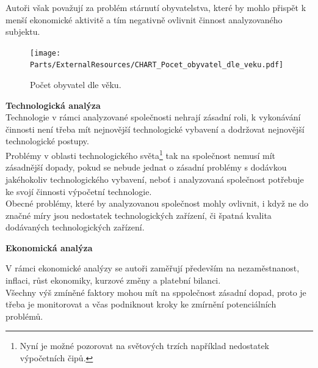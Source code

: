 Autoři však považují za problém stárnutí obyvatelstva, které by mohlo přispět k menší ekonomické aktivitě a tím negativně ovlivnit činnost analyzovaného subjektu.\\

\newpage

\begin{figure}[!hbtp]
	\centering
	\texttt{[image: Parts/ExternalResources/CHART\_Pocet\_obyvatel\_dle\_veku.pdf]}
	\caption[Počet obyvatel dle věku]{Počet obyvatel dle věku.}
	\label{fig:Pocet obyvatel dle veku}
\end{figure}




\noindent\textbf{Technologická analýza}\\

Technologie v rámci analyzované společnosti nehrají zásadní roli, k vykonávání činnosti není třeba mít nejnovější technologické vybavení a dodržovat nejnovější technologické postupy.\\

Problémy v oblasti technologického světa\footnote{Nyní je možné pozorovat na světových trzích například nedostatek výpočetních čipů.} tak na společnost nemusí mít zásadnější dopady, pokud se nebude jednat o zásadní problémy s dodávkou jakéhokoliv technologického vybavení, neboť i analyzovaná společnost potřebuje ke svojí činnosti výpočetní technologie.\\

Obecné problémy, které by analyzovanou společnost mohly ovlivnit, i když ne do značné míry jsou nedostatek technologických zařízení, či špatná kvalita dodávaných technologických zařízení.\\

\newpage

\noindent\textbf{Ekonomická analýza}\\

\vspace*{-2mm}

V rámci ekonomické analýzy se autoři zaměřují především na nezaměstnanost, inflaci, růst ekonomiky, kurzové změny a platební bilanci.\\

Všechny výš zmíněné faktory mohou mít na sppolečnost zásadní dopad, proto je třeba je monitorovat a včas podniknout kroky ke zmírnění potenciálních problémů.\\

